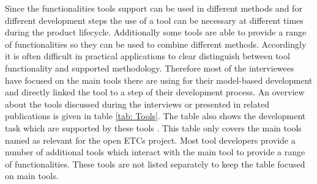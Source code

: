 \documentclass{./template/openetcs2}
\begin{document}
Since the functionalities tools support can be used in different methods and for different development steps the use of a tool can be necessary at different times during the product lifecycle. Additionally some tools are able to provide a range of functionalities so they can be used to combine different methods. Accordingly it is  often difficult in practical applications to clear distinguish between tool functionality and supported methodology. Therefore most of the interviewees have focused on the main tools there are using for their model-based development and directly linked the tool to a step of their development process. An overview about the tools discussed during the interviews or presented in related publications is given in table \ref{tab: Tools}. The table also shows the development task which are supported by these tools . This table only covers the main tools named as relevant for the open ETCs project. Most tool developers provide a number of additional tools which interact with the main tool to provide a range of functionalities. These tools are not listed separately to keep the table focused on main tools.

\end{document}
